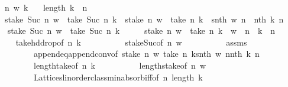 \begin{isabellebody}
\ \ \ n\ w\ k\isanewline
\ \ \ {\isachardoublequoteopen}length\ k\ {\isachargreater}{\kern0pt}\ n{\isachardoublequoteclose}\isanewline
\ \ \ {\isachardoublequoteopen}stake\ {\isacharparenleft}{\kern0pt}Suc\ n{\isacharparenright}{\kern0pt}\ w\ {\isacharequal}{\kern0pt}\ take\ {\isacharparenleft}{\kern0pt}Suc\ n{\isacharparenright}{\kern0pt}\ k\ {\isasymlongleftrightarrow}\ stake\ n\ w\ {\isacharequal}{\kern0pt}\ take\ n\ k\ {\isasymand}\ snth\ w\ n\ {\isacharequal}{\kern0pt}\ nth\ k\ n{\isachardoublequoteclose}\isanewline
%
\isadelimproof
%
\endisadelimproof
%
\isatagproof
{}\isamarkupfalse%
\isanewline
\ \ \isamarkupfalse%
\ {\isachardoublequoteopen}stake\ {\isacharparenleft}{\kern0pt}Suc\ n{\isacharparenright}{\kern0pt}\ w\ {\isacharequal}{\kern0pt}\ take\ {\isacharparenleft}{\kern0pt}Suc\ n{\isacharparenright}{\kern0pt}\ k{\isachardoublequoteclose}\isanewline
\ \ \isamarkupfalse%
\ \isamarkupfalse%
\ {\isachardoublequoteopen}stake\ n\ w\ {\isacharequal}{\kern0pt}\ take\ n\ k\ {\isasymand}\ w\ {\isacharbang}{\kern0pt}{\isacharbang}{\kern0pt}\ n\ {\isacharequal}{\kern0pt}\ k\ {\isacharbang}{\kern0pt}\ n{\isachardoublequoteclose}\isanewline
\ \ \ \ \isamarkupfalse%
\ take{\isacharunderscore}{\kern0pt}hd{\isacharunderscore}{\kern0pt}drop{\isacharbrackleft}{\kern0pt}of\ n\ k{\isacharbrackright}{\kern0pt}\isanewline
\ \ \ \ \ \ \ \ \ \ stake{\isacharunderscore}{\kern0pt}Suc{\isacharbrackleft}{\kern0pt}of\ n\ w{\isacharbrackright}{\kern0pt}\isanewline
\ \ \ \ \ \ \ \ \ \ assms\isanewline
\ \ \ \ \ \ \ \ \ \ append{\isacharunderscore}{\kern0pt}eq{\isacharunderscore}{\kern0pt}append{\isacharunderscore}{\kern0pt}conv{\isacharbrackleft}{\kern0pt}of\ {\isachardoublequoteopen}stake\ n\ w{\isachardoublequoteclose}\ {\isachardoublequoteopen}take\ n\ k{\isachardoublequoteclose}{\isachardoublequoteopen}{\isacharbrackleft}{\kern0pt}snth\ w\ n{\isacharbrackright}{\kern0pt}{\isachardoublequoteclose}{\isachardoublequoteopen}{\isacharbrackleft}{\kern0pt}nth\ k\ n{\isacharbrackright}{\kern0pt}{\isachardoublequoteclose}\ {\isacharbrackright}{\kern0pt}\isanewline
\ \ \ \ \ \ \ \ \ \ length{\isacharunderscore}{\kern0pt}take{\isacharbrackleft}{\kern0pt}of\ n\ k{\isacharbrackright}{\kern0pt}\isanewline
\ \ \ \ \ \ \ \ \ \ length{\isacharunderscore}{\kern0pt}stake{\isacharbrackleft}{\kern0pt}of\ n\ w{\isacharbrackright}{\kern0pt}\isanewline
\ \ \ \ \ \ \ \ \ \ Lattices{\isachardot}{\kern0pt}linorder{\isacharunderscore}{\kern0pt}class{\isachardot}{\kern0pt}min{\isachardot}{\kern0pt}absorb{\isacharunderscore}{\kern0pt}iff{}{\isacharbrackleft}{\kern0pt}of\ n\ {\isachardoublequoteopen}length\ k{\isachardoublequoteclose}{\isacharbrackright}{\kern0pt}\isanewline

\end{isabellebody}
